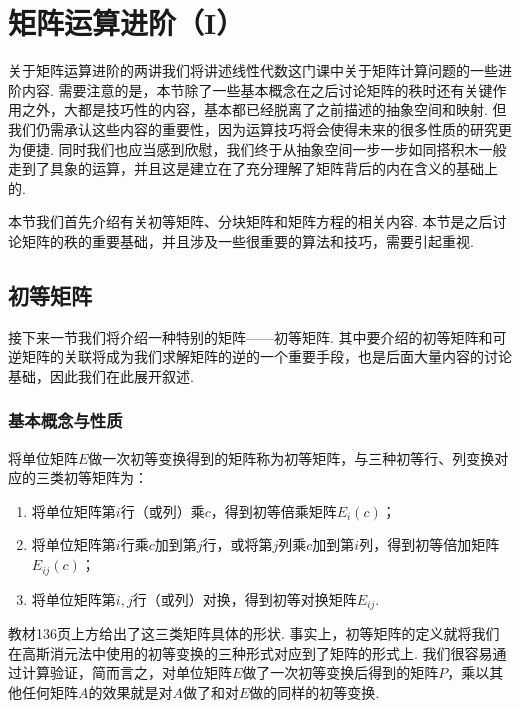 \chapter{矩阵运算进阶（I）}

关于矩阵运算进阶的两讲我们将讲述线性代数这门课中关于矩阵计算问题的一些进阶内容. 需要注意的是，本节除了一些基本概念在之后讨论矩阵的秩时还有关键作用之外，大都是技巧性的内容，基本都已经脱离了之前描述的抽象空间和映射. 但我们仍需承认这些内容的重要性，因为运算技巧将会使得未来的很多性质的研究更为便捷. 同时我们也应当感到欣慰，我们终于从抽象空间一步一步如同搭积木一般走到了具象的运算，并且这是建立在了充分理解了矩阵背后的内在含义的基础上的.

本节我们首先介绍有关初等矩阵、分块矩阵和矩阵方程的相关内容. 本节是之后讨论矩阵的秩的重要基础，并且涉及一些很重要的算法和技巧，需要引起重视.

\section{初等矩阵}

接下来一节我们将介绍一种特别的矩阵——初等矩阵. 其中要介绍的初等矩阵和可逆矩阵的关联将成为我们求解矩阵的逆的一个重要手段，也是后面大量内容的讨论基础，因此我们在此展开叙述.

\subsection{基本概念与性质}

\begin{definition}
    将单位矩阵$E$做一次初等变换得到的矩阵称为初等矩阵，与三种初等行、列变换对应的三类初等矩阵为：
    \begin{enumerate}
        \item 将单位矩阵第$i$行（或列）乘$c$，得到初等倍乘矩阵$E_i(c)$；

        \item 将单位矩阵第$i$行乘$c$加到第$j$行，或将第$j$列乘$c$加到第$i$列，得到初等倍加矩阵$E_{ij}(c)$；

        \item 将单位矩阵第$i,j$行（或列）对换，得到初等对换矩阵$E_{ij}$.
    \end{enumerate}
\end{definition}
教材136页上方给出了这三类矩阵具体的形状. 事实上，初等矩阵的定义就将我们在高斯消元法中使用的初等变换的三种形式对应到了矩阵的形式上. 我们很容易通过计算验证，简而言之，对单位矩阵$E$做了一次初等变换后得到的矩阵$P$，乘以其他任何矩阵$A$的效果就是对$A$做了和对$E$做的同样的初等变换.

